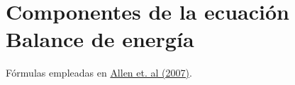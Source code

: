 


\pagestyle{fancy}
\maketitle

\newpage
\tableofcontents

\newpage

\section{Componentes de la ecuación Balance de energía}


Fórmulas empleadas en \href{https://www.researchgate.net/publication/228615269_Satellite-Based_Energy_Balance_for_Mapping_Evapotranspiration_With_Internalized_Calibration_METRIC_-_Model}{Allen et. al (2007)}.





